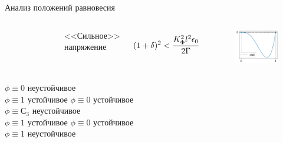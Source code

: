 \begin{frame}{Анализ положений равновесия}
\begin{columns}
\begin{figure}
\end{figure}
\begin{center}
	<<Сильное>> напряжение
\end{center}
\vspace{-0.2cm}
$$(1 + \delta)^2 < \cfrac{K_\Phi^2 l^2 \epsilon_0}{2 \Gamma}$$
\vspace{-0.7cm}
\begin{figure}
	\includegraphics[width=\textwidth]{figures/equilibriums_case_3.png}
\end{figure}
\end{columns}
\begin{columns}
\hspace{0.5cm}
$\phi \equiv 0$ неустойчивое \\
\hspace{0.5cm}
$\phi \equiv 1$ устойчивое
\hspace{0.5cm}
$\phi \equiv 0$ устойчивое \\
\hspace{0.5cm}
$\phi \equiv С_3$ неустойчивое \\
\hspace{0.5cm}
$\phi \equiv 1$ устойчивое
\hspace{0.5cm}
$\phi \equiv 0$ устойчивое \\
\hspace{0.5cm}
$\phi \equiv 1$ неустойчивое
\end{columns}
\end{frame}


